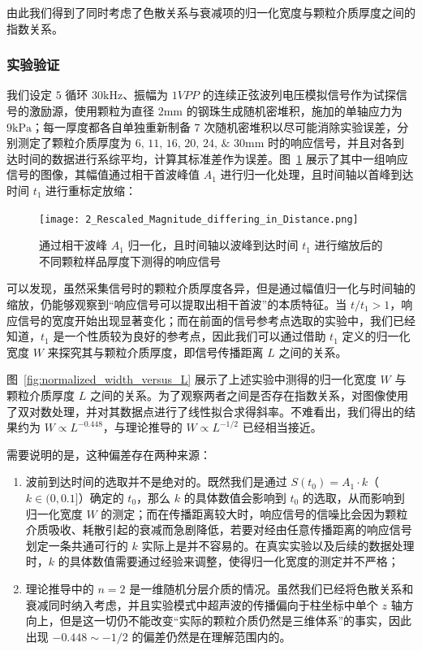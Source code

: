由此我们得到了同时考虑了色散关系与衰减项的归一化宽度与颗粒介质厚度之间的指数关系。

\subsubsection{实验验证}

我们设定 $5$ 循环 $30\unit{\kilo\Hz}$、振幅为 $1\unit{VPP}$ 的连续正弦波列电压模拟信号作为试探信号的激励源，使用颗粒为直径 $2\unit{\milli\meter}$ 的钢珠生成随机密堆积，施加的单轴应力为 $9\unit{\kilo\Pa}$；每一厚度都各自单独重新制备 7 次随机密堆积以尽可能消除实验误差，分别测定了颗粒介质厚度为 $\numlist{6;11;16;20;24;30}\unit{\milli\metre}$ 时的响应信号，并且对各到达时间的数据进行系综平均，计算其标准差作为误差。图~\ref{fig:reference_point} 展示了其中一组响应信号的图像，其幅值通过相干首波峰值 $A_{1}$ 进行归一化处理，且时间轴以首峰到达时间 $t_{1}$ 进行重标定放缩：

\begin{figure}[!htp]
  \centering
  \texttt{[image: 2\_Rescaled\_Magnitude\_differing\_in\_Distance.png]}
  \caption{通过相干波峰 $A_{1}$ 归一化，且时间轴以波峰到达时间 $t_{1}$ 进行缩放后的不同颗粒样品厚度下测得的响应信号}%
  \label{fig:reference_point}
\end{figure}

可以发现，虽然采集信号时的颗粒介质厚度各异，但是通过幅值归一化与时间轴的缩放，仍能够观察到“响应信号可以提取出相干首波”的本质特征。当 $t/t_{1} > 1$，响应信号的宽度开始出现显著变化；而在前面的信号参考点选取的实验中，我们已经知道，$t_{1}$ 是一个性质较为良好的参考点，因此我们可以通过借助 $t_{1}$ 定义的归一化宽度 $W$ 来探究其与颗粒介质厚度，即信号传播距离 $L$ 之间的关系。

图~\ref{fig:normalized_width_versus_L} 展示了上述实验中测得的归一化宽度 $W$ 与颗粒介质厚度 $L$ 之间的关系。为了观察两者之间是否存在指数关系，对图像使用了双对数处理，并对其数据点进行了线性拟合求得斜率。不难看出，我们得出的结果约为 $W\propto L^{-0.448}$，与理论推导的 $W\propto L^{-1/2}$ 已经相当接近。

需要说明的是，这种偏差存在两种来源：

\begin{enumerate}
  \item 波前到达时间的选取并不是绝对的。既然我们是通过 $S(t_{0}) = A_{1}\cdot k$（$k\in(0,0.1]$）确定的 $t_{0}$，那么 $k$ 的具体数值会影响到 $t_{0}$ 的选取，从而影响到归一化宽度 $W$ 的测定；而在传播距离较大时，响应信号的信噪比会因为颗粒介质吸收、耗散引起的衰减而急剧降低，若要对经由任意传播距离的响应信号划定一条共通可行的 $k$ 实际上是并不容易的。在真实实验以及后续的数据处理时，$k$ 的具体数值需要通过经验来调整，使得归一化宽度的测定并不严格；
  \item 理论推导中的 $n=2$ 是一维随机分层介质的情况。虽然我们已经将色散关系和衰减同时纳入考虑，并且实验模式中超声波的传播偏向于柱坐标中单个 $z$ 轴方向上，但是这一切仍不能改变“实际的颗粒介质仍然是三维体系”的事实，因此出现 $-0.448\sim-1/2$ 的偏差仍然是在理解范围内的。
\end{enumerate}


